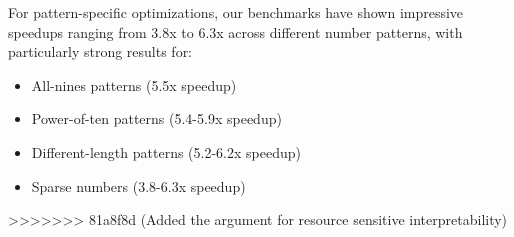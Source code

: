For pattern-specific optimizations, our benchmarks have shown impressive speedups ranging from 3.8x to 6.3x across different number patterns, with particularly strong results for:

\begin{itemize}
    \item All-nines patterns (5.5x speedup)
    \item Power-of-ten patterns (5.4-5.9x speedup)
    \item Different-length patterns (5.2-6.2x speedup)
    \item Sparse numbers (3.8-6.3x speedup)
\end{itemize}
>>>>>>> 81a8f8d (Added the argument for resource sensitive interpretability)
